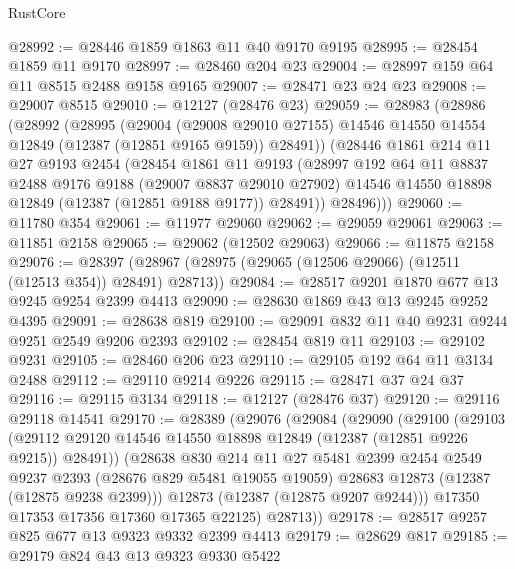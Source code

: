 \begin{lexlean}{RustCore}
\begin{coremodule}
@28992 := @28446 @1859 @1863 @11 @40 @9170 @9195
@28995 := @28454 @1859 @11 @9170
@28997 := @28460 @204 @23
@29004 := @28997 @159 @64 @11 @8515 @2488 @9158 @9165
@29007 := @28471 @23 @24 @23
@29008 := @29007 @8515
@29010 := @12127 (@28476 @23)
@29059 := @28983
    (@28986
      (@28992
        (@28995
          (@29004
            (@29008 @29010 @27155)
            @14546
            @14550
            @14554
            @12849
            (@12387 (@12851 @9165 @9159))
            @28491))
        (@28446
          @1861
          @214
          @11
          @27
          @9193
          @2454
          (@28454
            @1861
            @11
            @9193
            (@28997
              @192
              @64
              @11
              @8837
              @2488
              @9176
              @9188
              (@29007 @8837 @29010 @27902)
              @14546
              @14550
              @18898
              @12849
              (@12387 (@12851 @9188 @9177))
              @28491))
          @28496)))
@29060 := @11780 @354
@29061 := @11977 @29060
@29062 := @29059 @29061
@29063 := @11851 @2158
@29065 := @29062 (@12502 @29063)
@29066 := @11875 @2158
@29076 := @28397 (@28967 (@28975 (@29065 (@12506 @29066) (@12511 (@12513 @354)) @28491) @28713))
@29084 := @28517 @9201 @1870 @677 @13 @9245 @9254 @2399 @4413
@29090 := @28630 @1869 @43 @13 @9245 @9252 @4395
@29091 := @28638 @819
@29100 := @29091 @832 @11 @40 @9231 @9244 @9251 @2549 @9206 @2393
@29102 := @28454 @819 @11
@29103 := @29102 @9231
@29105 := @28460 @206 @23
@29110 := @29105 @192 @64 @11 @3134 @2488
@29112 := @29110 @9214 @9226
@29115 := @28471 @37 @24 @37
@29116 := @29115 @3134
@29118 := @12127 (@28476 @37)
@29120 := @29116 @29118 @14541
@29170 := @28389
    (@29076
      (@29084
        (@29090
          (@29100
            (@29103
              (@29112 @29120 @14546 @14550 @18898 @12849 (@12387 (@12851 @9226 @9215)) @28491))
            (@28638
              @830
              @214
              @11
              @27
              @5481
              @2399
              @2454
              @2549
              @9237
              @2393
              (@28676 @829 @5481 @19055 @19059)
              @28683
              @12873
              (@12387 (@12875 @9238 @2399)))
            @12873
            (@12387 (@12875 @9207 @9244)))
          @17350
          @17353
          @17356
          @17360
          @17365
          @22125)
        @28713))
@29178 := @28517 @9257 @825 @677 @13 @9323 @9332 @2399 @4413
@29179 := @28629 @817
@29185 := @29179 @824 @43 @13 @9323 @9330 @5422

\end{coremodule}
\end{lexlean}
